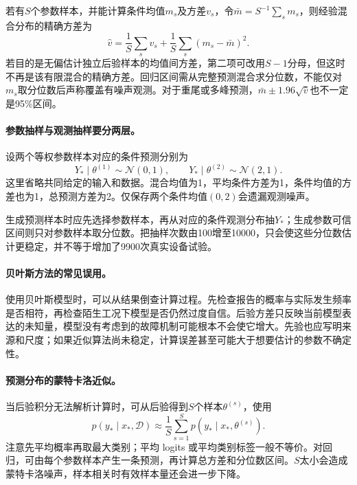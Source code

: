 若有$S$个参数样本，并能计算条件均值$m_s$及方差$v_s$，令$\bar m=S^{-1}\sum_sm_s$，则经验混合分布的精确方差为
\begin{equation}
 \hat v=\frac1S\sum_sv_s+\frac1S\sum_s(m_s-\bar m)^2.
\end{equation}
若目的是无偏估计独立后验样本的均值间方差，第二项可改用$S-1$分母，但这时不再是该有限混合的精确方差。回归区间需从完整预测混合求分位数，不能仅对$m_s$取分位数后声称覆盖有噪声观测。对于重尾或多峰预测，$\bar m\pm1.96\sqrt{\hat v}$也不一定是95\%区间。

\paragraph{参数抽样与观测抽样要分两层。}
设两个等权参数样本对应的条件预测分别为
\begin{equation*}
 Y_*\mid\theta^{(1)}\sim\mathcal N(0,1),\qquad
 Y_*\mid\theta^{(2)}\sim\mathcal N(2,1).
\end{equation*}
这里省略共同给定的输入和数据。混合均值为1，平均条件方差为1，条件均值的方差也为1，总预测方差为2。仅保存两个条件均值$(0,2)$会遗漏观测噪声。

生成预测样本时应先选择参数样本，再从对应的条件观测分布抽$Y_*$；生成参数可信区间则只对参数样本取分位数。把抽样次数由100增至10000，只会使这些分位数估计更稳定，并不等于增加了9900次真实设备试验。

\paragraph{贝叶斯方法的常见误用。}
使用贝叶斯模型时，可以从结果倒查计算过程。先检查报告的概率与实际发生频率是否相符，再检查陌生工况下模型是否仍然过度自信。后验方差只反映当前模型表达的未知量，模型没有考虑到的故障机制可能根本不会使它增大。先验也应写明来源和尺度；如果近似算法尚未稳定，计算误差甚至可能大于想要估计的参数不确定性。

\paragraph{预测分布的蒙特卡洛近似。}
当后验积分无法解析计算时，可从后验得到$S$个样本$\theta^{(s)}$，使用
\begin{equation}
 p(y_*\mid x_*,\mathcal D)\approx\frac1S\sum_{s=1}^{S}p(y_*\mid x_*,\theta^{(s)}).
\end{equation}
注意先平均概率再取最大类别；平均 logits 或平均类别标签一般不等价。对回归，可由每个参数样本产生一条预测，再计算总方差和分位数区间。$S$太小会造成蒙特卡洛噪声，样本相关时有效样本量还会进一步下降。

